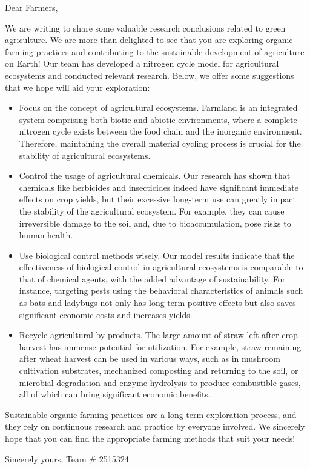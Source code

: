 \documentclass{mcmthesis}
\begin{document}
\newpage

\begin{letter}{Dear Farmers,}  

We are writing to share some valuable research conclusions related to green agriculture. We are more than delighted to see that you are exploring organic farming practices and contributing to the sustainable development of agriculture on Earth! Our team has developed a nitrogen cycle model for agricultural ecosystems and conducted relevant research. Below, we offer some suggestions that we hope will aid your exploration:

\begin{itemize}  
\item Focus on the concept of agricultural ecosystems. Farmland is an integrated system comprising both biotic and abiotic environments, where a complete nitrogen cycle exists between the food chain and the inorganic environment. Therefore, maintaining the overall material cycling process is crucial for the stability of agricultural ecosystems. 
\item Control the usage of agricultural chemicals. Our research has shown that chemicals like herbicides and insecticides indeed have significant immediate effects on crop yields, but their excessive long-term use can greatly impact the stability of the agricultural ecosystem. For example, they can cause irreversible damage to the soil and, due to bioaccumulation, pose risks to human health.  
\item Use biological control methods wisely. Our model results indicate that the effectiveness of biological control in agricultural ecosystems is comparable to that of chemical agents, with the added advantage of sustainability. For instance, targeting pests using the behavioral characteristics of animals such as bats and ladybugs not only has long-term positive effects but also saves significant economic costs and increases yields.  
\item Recycle agricultural by-products. The large amount of straw left after crop harvest has immense potential for utilization. For example, straw remaining after wheat harvest can be used in various ways, such as in mushroom cultivation substrates, mechanized composting and returning to the soil, or microbial degradation and enzyme hydrolysis to produce combustible gases, all of which can bring significant economic benefits. 
\end{itemize}  

Sustainable organic farming practices are a long-term exploration process, and they rely on continuous research and practice by everyone involved. We sincerely hope that you can find the appropriate farming methods that suit your needs!

\vspace{\parskip}

Sincerely yours,  
Team \# 2515324.

\end{letter}


\newpage
{}
\setcounter{lastpage}{\value{page}}
\thispagestyle{empty} 


\clearpage
\setcounter{page}{\value{lastpage}}
\end{document}
